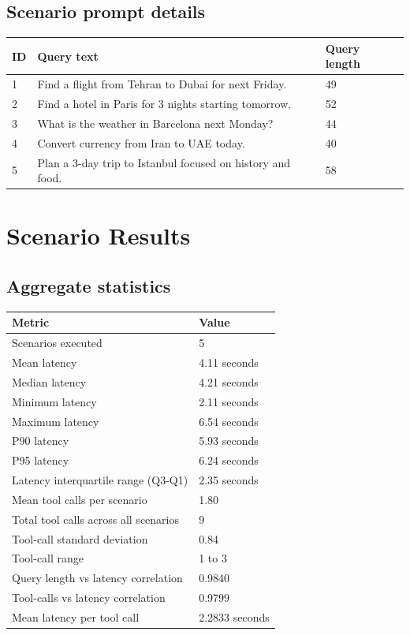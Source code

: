 \documentclass[12pt,a4paper]{article}
\begin{document}
\subsection*{Scenario prompt details}
\begin{longtable}{@{}p{} p{} p{}@{}}
\toprule
ID & Query text & Query length \\
\midrule
1 & Find a flight from Tehran to Dubai for next Friday. & 49 \\
2 & Find a hotel in Paris for 3 nights starting tomorrow. & 52 \\
3 & What is the weather in Barcelona next Monday? & 44 \\
4 & Convert currency from Iran to UAE today. & 40 \\
5 & Plan a 3-day trip to Istanbul focused on history and food. & 58 \\
\bottomrule
\end{longtable}

\section{Scenario Results}
\subsection*{Aggregate statistics}
\begin{longtable}{p{} p{}}
\toprule
Metric & Value \\
\midrule
Scenarios executed & 5 \\
Mean latency & 4.11 seconds \\
Median latency & 4.21 seconds \\
Minimum latency & 2.11 seconds \\
Maximum latency & 6.54 seconds \\
P90 latency & 5.93 seconds \\
P95 latency & 6.24 seconds \\
Latency interquartile range (Q3-Q1) & 2.35 seconds \\
Mean tool calls per scenario & 1.80 \\
Total tool calls across all scenarios & 9 \\
Tool-call standard deviation & 0.84 \\
Tool-call range & 1 to 3 \\
Query length vs latency correlation & 0.9840 \\
Tool-calls vs latency correlation & 0.9799 \\
Mean latency per tool call & 2.2833 seconds \\
\bottomrule
\end{longtable}
\end{document}
